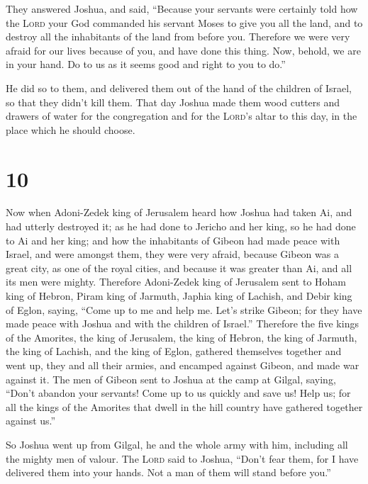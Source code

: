  They answered Joshua, and said, ``Because your servants
were certainly told how the \textsc{Lord} your God commanded his servant
Moses to give you all the land, and to destroy all the inhabitants of
the land from before you. Therefore we were very afraid for our lives
because of you, and have done this thing.  Now, behold,
we are in your hand. Do to us as it seems good and right to you to do.''

 He did so to them, and delivered them out of the hand of
the children of Israel, so that they didn't kill them. 
That day Joshua made them wood cutters and drawers of water for the
congregation and for the \textsc{Lord}'s altar to this day, in the place
which he should choose.

\hypertarget{section-9}{%
\section{10}\label{section-9}}

 Now when Adoni-Zedek king of Jerusalem heard how Joshua
had taken Ai, and had utterly destroyed it; as he had done to Jericho
and her king, so he had done to Ai and her king; and how the inhabitants
of Gibeon had made peace with Israel, and were amongst them,
 they were very afraid, because Gibeon was a great city,
as one of the royal cities, and because it was greater than Ai, and all
its men were mighty.  Therefore Adoni-Zedek king of
Jerusalem sent to Hoham king of Hebron, Piram king of Jarmuth, Japhia
king of Lachish, and Debir king of Eglon, saying,  ``Come
up to me and help me. Let's strike Gibeon; for they have made peace with
Joshua and with the children of Israel.''  Therefore the
five kings of the Amorites, the king of Jerusalem, the king of Hebron,
the king of Jarmuth, the king of Lachish, and the king of Eglon,
gathered themselves together and went up, they and all their armies, and
encamped against Gibeon, and made war against it.  The men
of Gibeon sent to Joshua at the camp at Gilgal, saying, ``Don't abandon
your servants! Come up to us quickly and save us! Help us; for all the
kings of the Amorites that dwell in the hill country have gathered
together against us.''

 So Joshua went up from Gilgal, he and the whole army with
him, including all the mighty men of valour.  The
\textsc{Lord} said to Joshua, ``Don't fear them, for I have delivered
them into your hands. Not a man of them will stand before you.''

